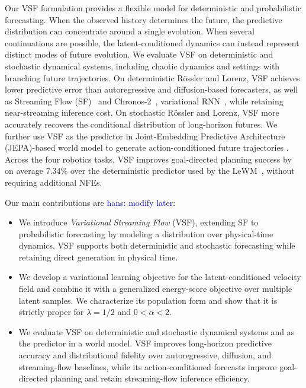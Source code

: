 \documentclass{article} %
\numberwithin{equation}{section}
\newcommand{\hans}[1]{\textcolor{blue}{hans: #1}}
\begin{document}
Our VSF formulation provides a flexible model for deterministic and probabilistic forecasting. When the observed history determines the future, the predictive distribution can concentrate around a single evolution. When several continuations are possible, the latent-conditioned dynamics can instead represent distinct modes of future evolution. We evaluate VSF on deterministic
and stochastic dynamical systems, including chaotic dynamics and settings with branching future trajectories. On deterministic R\"ossler and Lorenz, VSF achieves lower predictive error than autoregressive and diffusion-based forecasters, as well as Streaming Flow (SF)~\citep{jiang2025streaming}
and Chronos-2~\citep{ansari2025chronos}, variational RNN~\citep{salinas2020deepar}, while retaining near-streaming inference cost. On stochastic R\"ossler and Lorenz, VSF more accurately recovers the conditional distribution of long-horizon futures. We further use VSF as the predictor in Joint-Embedding Predictive Architecture (JEPA)-based world model to generate action-conditioned future trajectories \cite{maes2026leworldmodel}. Across the four robotics tasks, VSF improves goal-directed planning success by on average $7.34\%$ over the deterministic predictor used by the LeWM~\citealp{maes2026leworldmodel}, without requiring additional NFEs.  

Our main contributions are \hans{modify later}:
%
\begin{itemize}[leftmargin=*]
    \item We introduce \emph{Variational Streaming Flow} (VSF), extending SF to probabilistic forecasting by modeling a distribution over physical-time dynamics. VSF supports both deterministic and stochastic forecasting while retaining direct generation in physical time.

    \item We develop a variational learning objective for the latent-conditioned
    velocity field and combine it with a generalized energy-score objective over
    multiple latent samples. We characterize its population form and show that it
    is strictly proper for $\lambda=1/2$ and $0<\alpha<2$.

    \item We evaluate VSF on deterministic and stochastic dynamical systems and
    as the predictor in a world model. VSF improves long-horizon predictive
    accuracy and distributional fidelity over autoregressive, diffusion, and
    streaming-flow baselines, while its action-conditioned forecasts improve
    goal-directed planning and retain streaming-flow inference
    efficiency.
\end{itemize}
\end{document}
